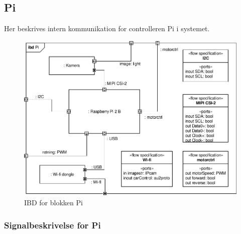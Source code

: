 \subsection{Pi}

Her beskrives intern kommunikation for controlleren Pi i systemet. 

\begin{figure}[h]
\centering
\includegraphics[scale=1]{../fig/diagrammer/bil/ibd_pi.pdf}
\caption{IBD for blokken Pi}
\label{fig:ibd_pi}
\end{figure}
\clearpage


\subsubsection{Signalbeskrivelse for Pi}

